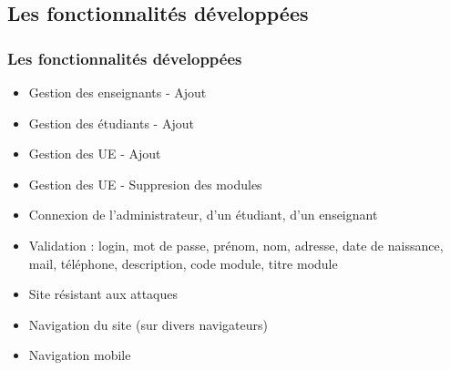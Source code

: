 \documentclass{beamer}
\begin{document}
    \subsection{Les fonctionnalités développées}
      \begin{frame}
        \frametitle{Les fonctionnalités développées}
        \begin{block}{}
          \begin{itemize}
            \item Gestion des enseignants - Ajout
            \item Gestion des étudiants - Ajout
            \item Gestion des UE - Ajout
            \item Gestion des UE - Suppresion des modules
            \item Connexion de l'administrateur, d'un étudiant, d'un enseignant
            \item Validation : login, mot de passe, prénom, nom, adresse, date de naissance, mail, téléphone, description, code module, titre module
            \item Site résistant aux attaques
            \item Navigation du site (sur divers navigateurs)
            \item Navigation mobile
          \end{itemize}
        \end{block}
      
      \end{frame}
    
\end{document}
